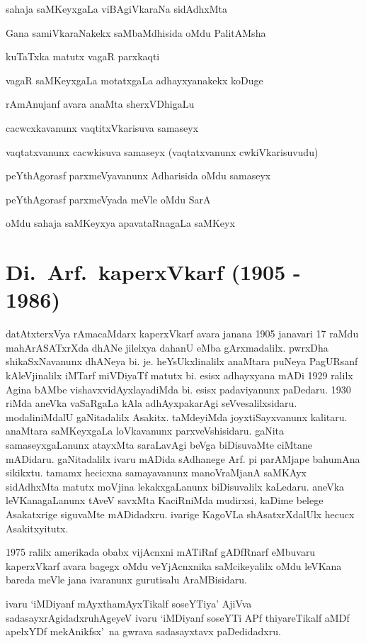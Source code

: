 sahaja saMKeyxgaLa viBAgiVkaraNa sidAdhxMta

Gana samiVkaraNakekx saMbaMdhisida oMdu PalitAMsha

kuTaTxka matutx vagaR parxkaqti

vagaR saMKeyxgaLa motatxgaLa adhayxyanakekx koDuge

rAmAnujanf avara anaMta sherxVDhigaLu

cacwcxkavanunx vaqtitxVkarisuva samaseyx

vaqtatxvanunx cacwkisuva samaseyx (vaqtatxvanunx cwkiVkarisuvudu)

peYthAgorasf parxmeVyavanunx Adharisida oMdu samaseyx

peYthAgorasf parxmeVyada meVle oMdu SarA

oMdu sahaja saMKeyxya apavataRnagaLa saMKeyx

\section{{\protect\bf Di.~Arf.\ kaperxVkarf  {\rm (1905 - 1986)}}}

\vskip -0.2cm

datAtxterxVya rAmacaMdarx kaperxVkarf avara janana {\rm 1905} janavari {\rm 17} raMdu mahArASATxrXda dhANe jilelxya dahanU eMba gArxmadalilx. pwrxDha shikaSxNavanunx dhANeya bi. je. heYsUkxli\-nalilx anaMtara puNeya PagURsanf kAleVjinalilx iMTarf miVDiyaTf matutx bi. esisx adhayxyana mADi {\rm 1929} ralilx Agina bAMbe vishavxvidAyxlayadiMda bi. esisx padaviyanunx paDedaru. {\rm 1930} riMda aneVka vaSaRgaLa kAla adhAyxpakarAgi seVvesalilxsidaru. modali\-niMdalU gaNitadalilx Asakitx. taMdeyiMda joyxtiSayxvanunx kalitaru. anaMtara saMKeyxgaLa loVkavanunx parxveVshisidaru. gaNita samaseyxgaLanunx atayxMta saraLavAgi beVga biDisuvaMte ciMtane mADidaru. gaNitadalilx ivaru mADida sAdhanege Arf. pi parAMjape bahumAna sikikxtu. tamamx hecicxna samayavanunx manoVraMjanA saMKAyx sidAdhxMta matutx moVjina lekakxgaLanunx biDisuvalilx kaLedaru. aneVka leVKanagaLanunx tAveV savxMta KaciRniMda mudirxsi, kaDime belege Asakatxrige siguvaMte mADidadxru. ivarige KagoVLa shAsatxrXdalUlx hecucx Asakitxyitutx. 

{\rm 1975} ralilx amerikada obabx vijAcnxni mATiRnf gADfRnarf eMbuvaru kaperxVkarf avara bagegx oMdu veYjAcnxnika saMcikeyalilx oMdu leVKana bareda meVle jana ivaranunx gurutisalu AraMBisidaru.

ivaru `iMDiyanf mAyxthamAyxTikalf soseYTiya' AjiVva sadasayxrAgidadxru\break hAgeyeV ivaru `iMDiyanf soseYTi APf thiyareTikalf aMDf apelxYDf mekAnikfsx'~na gwrava sadasayxtavx paDedidadxru.

